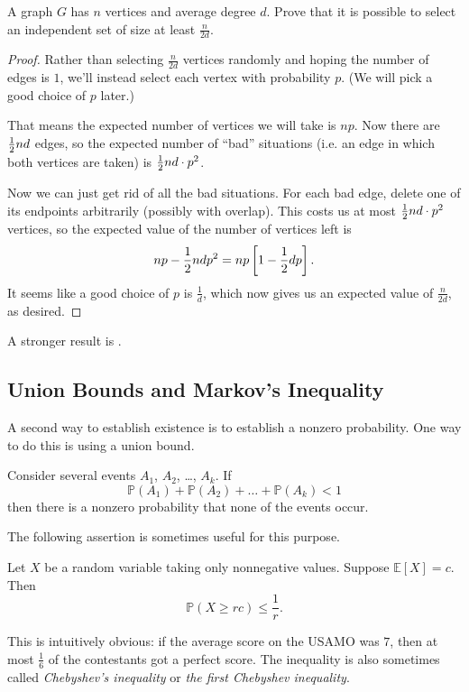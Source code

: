 \documentclass[11pt]{scrartcl}
\newcommand\EE{\mathbb E}
\newcommand\PP{\mathbb P}
\begin{document}
\begin{example}
	 A graph $G$ has $n$ vertices and average degree $d$.
	Prove that it is possible to select an independent set of size at least $\frac{n}{2d}$.
\end{example}
\begin{proof}
	Rather than selecting $\frac{n}{2d}$ vertices randomly and hoping the number of edges is $1$,
	we'll instead select each vertex with probability $p$.
	(We will pick a good choice of $p$ later.)

	That means the expected number of vertices we will take is $np$.
	Now there are $\frac{1}{2} nd$ edges, so the expected number of ``bad'' situations ({i.e.} an edge
	in which both vertices are taken) is $\frac{1}{2} nd \cdot p^2$.

	Now we can just get rid of all the bad situations.
	For each bad edge, delete one of its endpoints arbitrarily (possibly with overlap).
	This costs us at most $\frac{1}{2} nd \cdot p^2$ vertices, so the expected value
	of the number of vertices left is
	\[ np - \frac{1}{2} nd p^2 = np \left[ 1 - \frac{1}{2} dp \right]. \]
	It seems like a good choice of $p$ is $\frac 1d$, which now gives us an expected value
	of $\frac{n}{2d}$, as desired.
\end{proof}
A stronger result is .


\subsection{Union Bounds and Markov's Inequality}
A second way to establish existence is to establish a nonzero probability.
One way to do this is using a union bound.
\begin{proposition}
	Consider several events $A_1$, $A_2$, \dots, $A_k$.  If
	\[ \PP(A_1) + \PP(A_2) + \dots + \PP(A_k) < 1 \]
	then there is a nonzero probability that none of the events occur.
\end{proposition}

The following assertion is sometimes useful for this purpose.
\begin{theorem}
	Let $X$ be a random variable taking only nonnegative values.
	Suppose $\EE[X] = c$. Then
	\[ \PP(X \ge rc) \le \frac{1}{r} . \]
\end{theorem}
This is intuitively obvious: if the average score on the USAMO was $7$,
then at most $\frac 16$ of the contestants got a perfect score.
The inequality is also sometimes called \emph{Chebyshev's inequality} or
\emph{the first Chebyshev inequality}.
\end{document}
